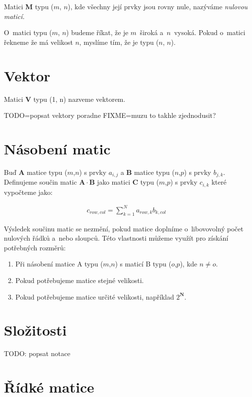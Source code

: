 \documentclass[thesis=B,czech]{FITthesis}[2012/06/26]
\begin{document}
Matici \textbf{M} typu ($m$, $n$), kde všechny její prvky jsou rovny nule, nazýváme \textit{nulovou maticí.}

O~matici typu ($m$, $n$) budeme říkat, že je $m$~široká a~$n$~vysoká. Pokud o~matici řekneme že má velikost $n$, myslíme tím, že je typu ($n$, $n$).

\section{Vektor}

Matici \textbf{V} typu (1, n) nazveme vektorem.

TODO=popsat vektory poradne
FIXME=muzu to takhle zjednodusit?

\section{Násobení matic}

Buď \textbf{A} matice typu ($m$,$n$) s prvky $a_{i,j}$ a \textbf{B} matice typu ($n$,$p$) s prvky $b_{j,k}$. Definujeme součin matic $\mathbf{A} \cdot \mathbf{B}$ jako matici \textbf{C} typu ($m$,$p$) s prvky $c_{i,k}$ které vypočteme jako:

\begin{align}
c_{row,col}=\sum_{k=1}^{N} a_{row,k} b_{k,col}
\end{align}

Výsledek součinu matic se nezmění, pokud matice doplníme o~libovovolný počet nulových řádků a~nebo sloupců. Této vlastnosti můžeme využít pro získání potřebných rozměrů:

\begin{enumerate}
  \item Při násobení matice A typu ($m$,$n$) s maticí B typu ($o$,$p$), kde $ n \neq o $.
  \item Pokud potřebujeme matice stejné velikosti.
  \item Pokud potřebujeme matice určité velikosti, například $ 2^{ \mathbf{N}} $.
\end{enumerate}

\section{Složitosti}

TODO: popsat notace


\section{Řídké matice}
\end{document}
